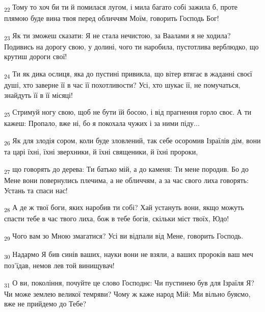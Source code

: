 \begin{tcolorbox}
\textsubscript{22} Тому то хоч би ти й помилася лугом, і мила багато собі зажила б, проте плямою буде вина твоя перед обличчям Моїм, говорить Господь Бог!
\end{tcolorbox}
\begin{tcolorbox}
\textsubscript{23} Як ти зможеш сказати: Я не стала нечистою, за Ваалами я не ходила? Подивись на дорогу свою, у долині, чого ти наробила, пустотлива верблюдко, що крутиш дороги свої!
\end{tcolorbox}
\begin{tcolorbox}
\textsubscript{24} Ти як дика ослиця, яка до пустині привикла, що вітер втягає в жаданні своєї душі, хто заверне її в час її похотливости? Усі, хто шукає її, не помучаться, знайдуть її в її місяці!
\end{tcolorbox}
\begin{tcolorbox}
\textsubscript{25} Стримуй ногу свою, щоб не бути їй босою, і від прагнення горло своє. А ти кажеш: Пропало, вже ні, бо я покохала чужих і за ними піду...
\end{tcolorbox}
\begin{tcolorbox}
\textsubscript{26} Як для злодія сором, коли буде зловлений, так себе осоромив Ізраїлів дім, вони та царі їхні, їхні зверхники, й їхні священики, й їхні пророки,
\end{tcolorbox}
\begin{tcolorbox}
\textsubscript{27} що говорять до дерева: Ти батько мій, а до каменя: Ти мене породив. Бо до Мене вони повернулись плечима, а не обличчям, а за час свого лиха говорять: Устань та спаси нас!
\end{tcolorbox}
\begin{tcolorbox}
\textsubscript{28} А де ж твої боги, яких наробив ти собі? Хай устануть вони, якщо можуть спасти тебе в час твого лиха, бож в тебе богів, скільки міст твоїх, Юдо!
\end{tcolorbox}
\begin{tcolorbox}
\textsubscript{29} Чого вам зо Мною змагатися? Усі ви відпали від Мене, говорить Господь.
\end{tcolorbox}
\begin{tcolorbox}
\textsubscript{30} Надармо Я бив синів ваших, науки вони не взяли, а ваших пророків ваш меч поз'їдав, немов лев той винищувач!
\end{tcolorbox}
\begin{tcolorbox}
\textsubscript{31} О ви, покоління, почуйте це слово Господнє: Чи пустинею був для Ізраїля Я? Чи може землею великої темряви? Чому ж каже народ Мій: Ми вільно буяємо, вже не прийдемо до Тебе?
\end{tcolorbox}
